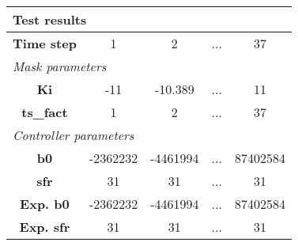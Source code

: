 \vspace{1em}
\begin{tabularx}{\textwidth}{|c|c|c|>{\centering\arraybackslash}X|c|}
\hline
\multicolumn{5}{|l|}{\cellcolor[gray]{0.8}\textbf{Test results}} \tabularnewline \hline
\textbf{Time step} & 1 & 2 & ... & 37 \tabularnewline \hline
\multicolumn{5}{|l|}{\cellcolor[gray]{0.9}\textit{Mask parameters}} \tabularnewline \hline
\textbf{Ki} & -11 & -10.389 & ... & 11 \tabularnewline \hline
\textbf{ts\_fact} & 1 & 2 & ... & 37 \tabularnewline \hline
\multicolumn{5}{|l|}{\cellcolor[gray]{0.9}\textit{Controller parameters}} \tabularnewline \hline
\textbf{b0} & -2362232 & -4461994 & ... & 87402584 \tabularnewline \hline
\textbf{sfr} & 31 & 31 & ... & 31 \tabularnewline \hline
\textbf{Exp. b0} & -2362232 & -4461994 & ... & 87402584 \tabularnewline \hline
\textbf{Exp. sfr} & 31 & 31 & ... & 31 \tabularnewline \hline
\end{tabularx}
\vspace{1ex}
